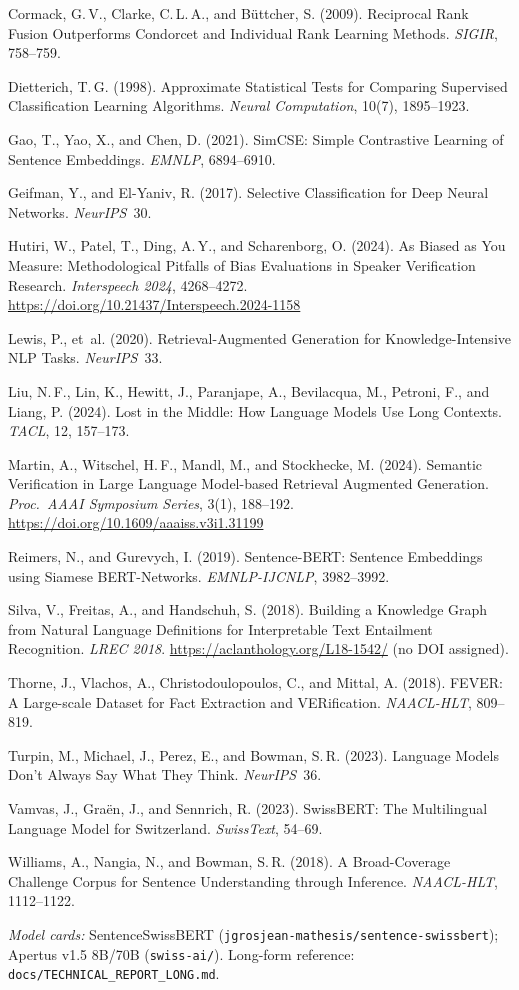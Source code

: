 \documentclass[10pt,a4paper]{article}
\begin{document}
{\footnotesize
\begin{enumerate}[label={[\arabic*]},leftmargin=1.5em]
\item Cormack, G.\,V., Clarke, C.\,L.\,A., and Büttcher, S. (2009). Reciprocal Rank Fusion Outperforms Condorcet and Individual Rank Learning Methods. \emph{SIGIR}, 758--759.
\item Dietterich, T.\,G. (1998). Approximate Statistical Tests for Comparing Supervised Classification Learning Algorithms. \emph{Neural Computation}, 10(7), 1895--1923.
\item Gao, T., Yao, X., and Chen, D. (2021). SimCSE: Simple Contrastive Learning of Sentence Embeddings. \emph{EMNLP}, 6894--6910.
\item Geifman, Y., and El-Yaniv, R. (2017). Selective Classification for Deep Neural Networks. \emph{NeurIPS}~30.
\item Hutiri, W., Patel, T., Ding, A.\,Y., and Scharenborg, O. (2024). As Biased as You Measure: Methodological Pitfalls of Bias Evaluations in Speaker Verification Research. \emph{Interspeech 2024}, 4268--4272. \url{https://doi.org/10.21437/Interspeech.2024-1158}
\item Lewis, P., et~al. (2020). Retrieval-Augmented Generation for Knowledge-Intensive NLP Tasks. \emph{NeurIPS}~33.
\item Liu, N.\,F., Lin, K., Hewitt, J., Paranjape, A., Bevilacqua, M., Petroni, F., and Liang, P. (2024). Lost in the Middle: How Language Models Use Long Contexts. \emph{TACL}, 12, 157--173.
\item Martin, A., Witschel, H.\,F., Mandl, M., and Stockhecke, M. (2024). Semantic Verification in Large Language Model-based Retrieval Augmented Generation. \emph{Proc.\ AAAI Symposium Series}, 3(1), 188--192. \url{https://doi.org/10.1609/aaaiss.v3i1.31199}
\item Reimers, N., and Gurevych, I. (2019). Sentence-BERT: Sentence Embeddings using Siamese BERT-Networks. \emph{EMNLP-IJCNLP}, 3982--3992.
\item Silva, V., Freitas, A., and Handschuh, S. (2018). Building a Knowledge Graph from Natural Language Definitions for Interpretable Text Entailment Recognition. \emph{LREC 2018}. \url{https://aclanthology.org/L18-1542/} (no DOI assigned).
\item Thorne, J., Vlachos, A., Christodoulopoulos, C., and Mittal, A. (2018). FEVER: A Large-scale Dataset for Fact Extraction and VERification. \emph{NAACL-HLT}, 809--819.
\item Turpin, M., Michael, J., Perez, E., and Bowman, S.\,R. (2023). Language Models Don't Always Say What They Think. \emph{NeurIPS}~36.
\item Vamvas, J., Graën, J., and Sennrich, R. (2023). SwissBERT: The Multilingual Language Model for Switzerland. \emph{SwissText}, 54--69.
\item Williams, A., Nangia, N., and Bowman, S.\,R. (2018). A Broad-Coverage Challenge Corpus for Sentence Understanding through Inference. \emph{NAACL-HLT}, 1112--1122.
\end{enumerate}

\smallskip
\textit{Model cards:} SentenceSwissBERT (\texttt{jgrosjean-mathesis/sentence-swissbert}); Apertus v1.5 8B/70B (\texttt{swiss-ai/}). Long-form reference: \texttt{docs/TECHNICAL\_REPORT\_LONG.md}.}
\end{document}
